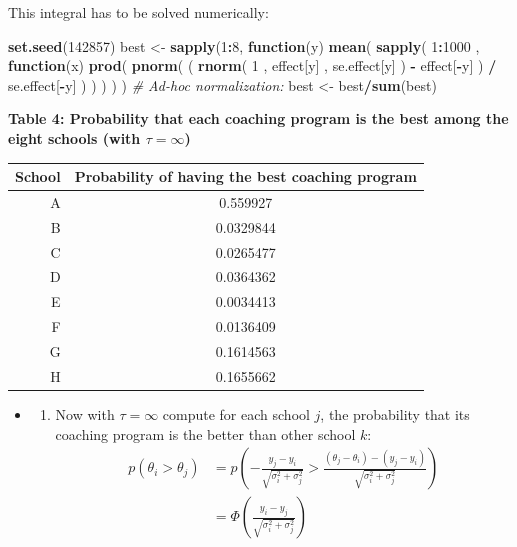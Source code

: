 \documentclass[]{article}
\newenvironment{Shaded}{\begin{snugshade}}{\end{snugshade}}
\newcommand{\KeywordTok}[1]{\textcolor[rgb]{0.13,0.29,0.53}{\textbf{#1}}}
\newcommand{\DecValTok}[1]{\textcolor[rgb]{0.00,0.00,0.81}{#1}}
\newcommand{\StringTok}[1]{\textcolor[rgb]{0.31,0.60,0.02}{#1}}
\newcommand{\CommentTok}[1]{\textcolor[rgb]{0.56,0.35,0.01}{\textit{#1}}}
\newcommand{\ControlFlowTok}[1]{\textcolor[rgb]{0.13,0.29,0.53}{\textbf{#1}}}
\newcommand{\OperatorTok}[1]{\textcolor[rgb]{0.81,0.36,0.00}{\textbf{#1}}}
\newcommand{\NormalTok}[1]{#1}
\providecommand{\tightlist}{%
  \setlength{\itemsep}{0pt}\setlength{\parskip}{0pt}}
\begin{document}
This integral has to be solved numerically:

\begin{Shaded}
\begin{Highlighting}[]
\KeywordTok{set.seed}\NormalTok{(}\DecValTok{142857}\NormalTok{)}
\NormalTok{best            <-}\StringTok{  }\KeywordTok{sapply}\NormalTok{(}\DecValTok{1}\OperatorTok{:}\DecValTok{8}\NormalTok{,}
                      \ControlFlowTok{function}\NormalTok{(y) }\KeywordTok{mean}\NormalTok{( }\KeywordTok{sapply}\NormalTok{( }\DecValTok{1}\OperatorTok{:}\DecValTok{1000}\NormalTok{ ,}
                        \ControlFlowTok{function}\NormalTok{(x) }
                          \KeywordTok{prod}\NormalTok{( }\KeywordTok{pnorm}\NormalTok{( ( }
                            \KeywordTok{rnorm}\NormalTok{( }\DecValTok{1}\NormalTok{ , effect[y] , se.effect[y] ) }\OperatorTok{-}\StringTok{ }\NormalTok{effect[}\OperatorTok{-}\NormalTok{y] ) }\OperatorTok{/}\StringTok{ }
\StringTok{                              }\NormalTok{se.effect[}\OperatorTok{-}\NormalTok{y] ) ) )}
\NormalTok{                           )}
\NormalTok{                           )}
\CommentTok{# Ad-hoc normalization:}
\NormalTok{best            <-}\StringTok{ }\NormalTok{best}\OperatorTok{/}\KeywordTok{sum}\NormalTok{(best)  }
\end{Highlighting}
\end{Shaded}

\textbf{Table 4: Probability that each coaching program is the best
among the eight schools (with \(\tau = \infty\))}

\begin{longtable}[]{@{}rc@{}}
\toprule
School & Probability of having the best coaching program\tabularnewline
\midrule
\endhead
A & 0.559927\tabularnewline
B & 0.0329844\tabularnewline
C & 0.0265477\tabularnewline
D & 0.0364362\tabularnewline
E & 0.0034413\tabularnewline
F & 0.0136409\tabularnewline
G & 0.1614563\tabularnewline
H & 0.1655662\tabularnewline
\bottomrule
\end{longtable}

\begin{itemize}
\item
  \begin{enumerate}
  \def\labelenumi{(\roman{enumi})}
  \setcounter{enumi}{1}
  \tightlist
  \item
    Now with \(\tau = \infty\) compute for each school \(j\), the
    probability that its coaching program is the better than other
    school \(k\):\\
    \[
    \begin{aligned}  
    p(\theta_{i}>\theta_{j}) &= p\left(-\frac{y_{j} - y_{i}}{\sqrt{\sigma_{i}^{2} + \sigma_{j}^{2}}} > \frac{(\theta_{j}-\theta_{i})- (y_{j} - y_{i})}{\sqrt{\sigma_{i}^{2} + \sigma_{j}^{2}}} \right) \\
                     &= \Phi\left( \frac{y_{i} - y_{j}}{\sqrt{\sigma_{i}^{2} + \sigma_{j}^{2}}}\right)
    \end{aligned}
    \]
  \end{enumerate}
\end{itemize}
\end{document}

